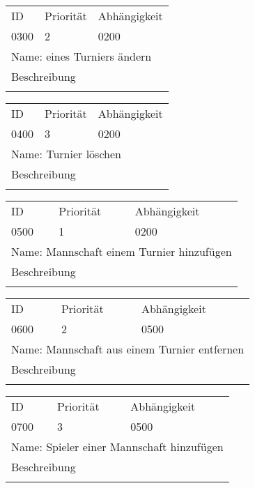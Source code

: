	\begin{tabularx}{\textwidth}{|X|X|X|}
		\hline
		ID & Priorität & Abhängigkeit \\
		0300 & 2 & 0200\\
		\hline
		\multicolumn{3}{|l|}{Name: eines Turniers ändern} \\
		\hline
		\multicolumn{3}{|l|}{Beschreibung}\\
		\multicolumn{3}{|l|}{}\\
		\hline		 
	\end{tabularx}
	
	\begin{tabularx}{\textwidth}{|X|X|X|}
		\hline
		ID & Priorität & Abhängigkeit \\
		0400 & 3 & 0200\\
		\hline
		\multicolumn{3}{|l|}{Name: Turnier löschen} \\
		\hline
		\multicolumn{3}{|l|}{Beschreibung}\\
		\multicolumn{3}{|l|}{}\\
		\hline		 
	\end{tabularx}
	
	\begin{tabularx}{\textwidth}{|X|X|X|}
		\hline
		ID & Priorität & Abhängigkeit \\
		0500 & 1 & 0200\\
		\hline
		\multicolumn{3}{|l|}{Name: Mannschaft einem Turnier hinzufügen} \\
		\hline
		\multicolumn{3}{|l|}{Beschreibung}\\
		\multicolumn{3}{|l|}{}\\
		\hline		 
	\end{tabularx}
	
	\begin{tabularx}{\textwidth}{|X|X|X|}
		\hline
		ID & Priorität & Abhängigkeit \\
		0600 & 2 & 0500\\
		\hline
		\multicolumn{3}{|l|}{Name: Mannschaft aus einem Turnier entfernen} \\
		\hline
		\multicolumn{3}{|l|}{Beschreibung}\\
		\multicolumn{3}{|l|}{}\\
		\hline		 
	\end{tabularx}
	
	\begin{tabularx}{\textwidth}{|X|X|X|}
		\hline
		ID & Priorität & Abhängigkeit \\
		0700 & 3 & 0500\\
		\hline
		\multicolumn{3}{|l|}{Name: Spieler einer Mannschaft hinzufügen} \\
		\hline
		\multicolumn{3}{|l|}{Beschreibung}\\
		\multicolumn{3}{|l|}{}\\
		\hline		 
	\end{tabularx}
	
